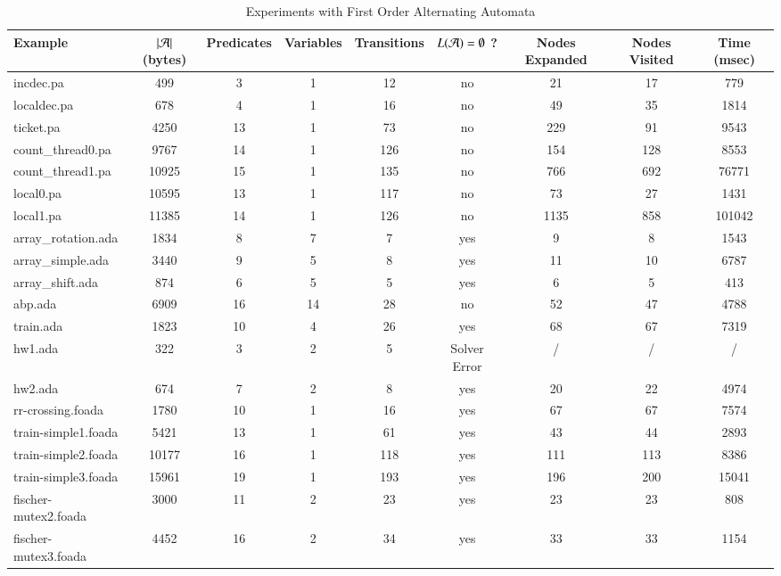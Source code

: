 \begin{table}[htb]
\vspace*{-\baselineskip}
\begin{center}
{\fontsize{7}{8}\selectfont
\begin{tabular}{||l|c|c|c|c|c|c|c|c||}
\hline
Example & ${|{\mathcal{A}}|}$ (bytes) & Predicates & Variables & Transitions & $L(\mathcal{A})=\emptyset$ ? & Nodes Expanded & Nodes Visited & Time (msec) \\
\hline
incdec.pa & 499 & 3 & 1 & 12 & no & 21 & 17 & 779 \\
\hline
localdec.pa & 678 & 4 & 1 & 16 & no & 49 & 35 & 1814 \\
\hline
ticket.pa & 4250 & 13 & 1 & 73 & no & 229 & 91 & 9543 \\
\hline
count\_thread0.pa & 9767 & 14 & 1 & 126 & no & 154 & 128 & 8553 \\
\hline
count\_thread1.pa & 10925 & 15 & 1 & 135 & no & 766 & 692 & 76771 \\
\hline
local0.pa & 10595 & 13 & 1 & 117 & no & 73 & 27 & 1431 \\
\hline
local1.pa & 11385 & 14 & 1 & 126 & no & 1135 & 858 & 101042 \\
\hline
array\_rotation.ada & 1834 & 8 & 7 & 7 & yes & 9 & 8 & 1543 \\
\hline
array\_simple.ada & 3440 & 9 & 5 & 8 & yes & 11 & 10 & 6787 \\
\hline
array\_shift.ada & 874 & 6 & 5 & 5 & yes & 6 & 5 & 413 \\
\hline
abp.ada & 6909 & 16 & 14 & 28 & no & 52 & 47 & 4788 \\
\hline
train.ada & 1823 & 10 & 4 & 26 & yes & 68 & 67 & 7319 \\
\hline
hw1.ada & 322 & 3 & 2 & 5 & Solver Error & / & / & / \\
\hline
hw2.ada & 674 & 7 & 2 & 8 & yes & 20 & 22 & 4974 \\
\hline
rr-crossing.foada & 1780 & 10 & 1 & 16 & yes & 67 & 67 & 7574 \\
\hline
train-simple1.foada & 5421 & 13 & 1 & 61 & yes & 43 & 44 & 2893 \\
\hline
train-simple2.foada & 10177 & 16 & 1 & 118 & yes & 111 & 113 & 8386 \\
\hline
train-simple3.foada & 15961 & 19 & 1 & 193 & yes & 196 & 200 & 15041 \\
\hline
fischer-mutex2.foada & 3000 & 11 & 2 & 23 & yes & 23 & 23 & 808 \\
\hline
fischer-mutex3.foada & 4452 & 16 & 2 & 34 & yes & 33 & 33 & 1154 \\
\hline
\end{tabular}
}
\caption{Experiments with First Order Alternating Automata}
\label{tab:experiments}
\end{center}
\vspace*{-3\baselineskip}
\end{table}

